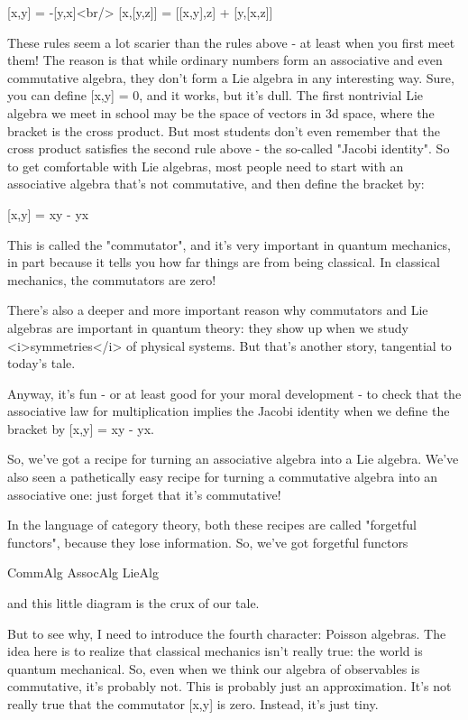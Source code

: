 [x,y] = -[y,x]<br/>
[x,[y,z]] = [[x,y],z] + [y,[x,z]]

These rules seem a lot scarier than the rules above - at least when
you first meet them!  The reason is that while ordinary numbers form
an associative and even commutative algebra, they don't form a Lie
algebra in any interesting way.  Sure, you can define [x,y] = 0, and
it works, but it's dull.  The first nontrivial Lie algebra we meet in
school may be the space of vectors in 3d space, where the bracket is
the cross product.  But most students don't even remember that the
cross product satisfies the second rule above - the so-called
"Jacobi identity".  So to get comfortable with Lie algebras,
most people need to start with an associative algebra that's not
commutative, and then define the bracket by:

[x,y] = xy - yx

This is called the "commutator", and it's very important in
quantum mechanics, in part because it tells you how far things are
from being classical.  In classical mechanics, the commutators are
zero!

There's also a deeper and more important reason why commutators and
Lie algebras are important in quantum theory: they show up when we
study <i>symmetries</i> of physical systems.  But that's another story,
tangential to today's tale.

Anyway, it's fun - or at least good for your moral development - to
check that the associative law for multiplication implies the Jacobi
identity when we define the bracket by [x,y] = xy - yx.

So, we've got a recipe for turning an associative algebra into a Lie
algebra.  We've also seen a pathetically easy recipe for turning a
commutative algebra into an associative one: just forget that it's
commutative!  

In the language of category theory, both these recipes are called
"forgetful functors", because they lose information.  So,
we've got forgetful functors

CommAlg \to  AssocAlg \to  LieAlg

and this little diagram is the crux of our tale.  

But to see why, I need to introduce the fourth character: Poisson
algebras.  The idea here is to realize that classical mechanics isn't
really true: the world is quantum mechanical.  So, even when we think
our algebra of observables is commutative, it's probably not.  This is
probably just an approximation.  It's not really true that the
commutator [x,y] is zero.  Instead, it's just tiny.

